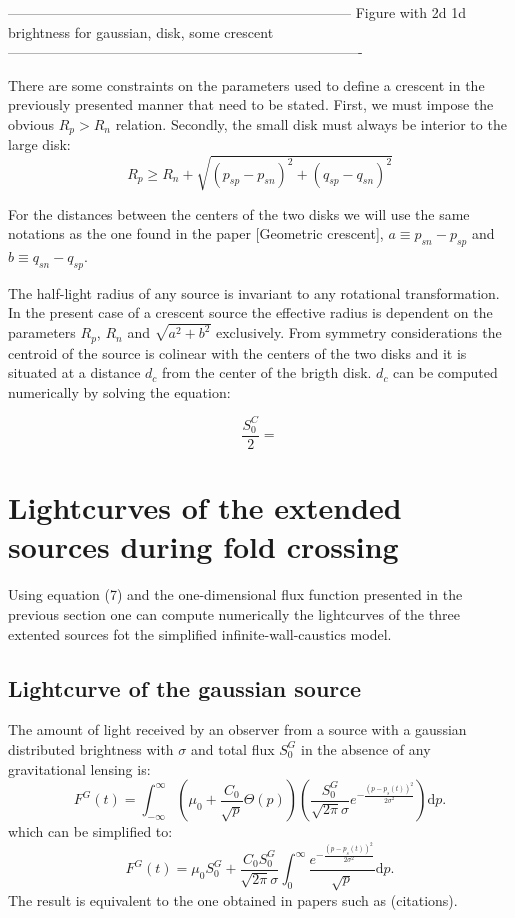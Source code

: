 --------------------------------------------------------------------------
Figure with 2d 1d brightness for gaussian, disk, some crescent
----------------------------------------------------------------------------

There are some constraints on the parameters used to define a crescent in the previously presented manner that need to be stated. First, we must impose the obvious $R_p > R_n$ relation. Secondly, 
the small disk must always be interior to the large disk:
\begin{equation}
 R_p \ge R_n + \sqrt{\left(p_{sp} - p_{sn} \right)^2 + \left(q_{sp} - q_{sn} \right)^2}
\end{equation}

For the distances between the centers of the two disks we will use the same notations as the one found in the paper [Geometric crescent], $a \equiv p_{sn} - p_{sp}$ and $b \equiv q_{sn} - q_{sp}$.

The half-light radius of any source is invariant to any rotational transformation. In the present case of a crescent source the effective radius is dependent on the parameters $R_p$, $R_n$ and $\sqrt{a^2+b^2}$ exclusively. From symmetry considerations the centroid of the source is colinear with the centers of the two disks and it is situated at a distance $d_c$ from the center of the brigth disk. $d_c$ can be computed numerically by solving the equation:

\begin{equation}
\frac{S_0^C}{2} =  
\end{equation}   

\section{Lightcurves of the extended sources during fold crossing}

Using equation (7) and the one-dimensional flux function presented in the previous section one can compute numerically the lightcurves of the three extented sources fot the simplified 
infinite-wall-caustics model.

\subsection{Lightcurve of the gaussian source}

The amount of light received by an observer from a source with a gaussian distributed brightness with $\sigma$ and total flux $S_0^G$ in the absence of any gravitational lensing is:
\begin{equation}
 F^G(t) = \int_{-\infty}^\infty  \left( \mu_0 + \frac{C_0}{\sqrt{p}} \Theta \left( p \right) \right) \left( \frac{S_0^G}{\sqrt{2 \pi} \sigma} e^{-\frac{(p-p_s(t))^2}{2 \sigma^2}} \right) \mathrm{d}p.
\end{equation}
which can be simplified to:
\begin{equation}
 F^G(t) = \mu_0 S_0^G + \frac{C_0 S_0^G}{\sqrt{2\pi} \sigma} \int_{0}^\infty \frac{e^{-\frac{(p-p_s(t))^2}{2 \sigma^2}}}{\sqrt{p}} \mathrm{d}p.
\end{equation}
The result is equivalent to the one obtained in papers such as (citations).\\

